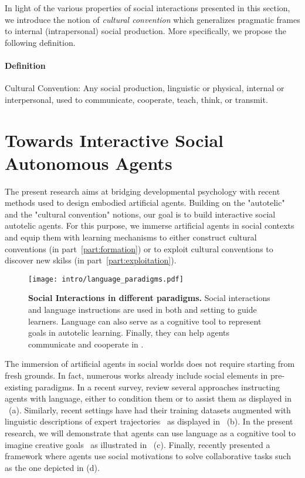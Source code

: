 In light of the various properties of social interactions presented in this section, we introduce the notion of \textit{cultural convention} which generalizes pragmatic frames to internal (intrapersonal) social production. More specifically, we propose the following definition.

\begin{tcolorbox}
\small
\paragraph{Definition}
\gls{Cultural Convention}: Any social production, linguistic or physical, internal or interpersonal, used to communicate, cooperate, teach, think, or transmit.
\end{tcolorbox}

\newpage

\section{Towards Interactive Social Autonomous Agents}

The present research aims at bridging developmental psychology with recent \ai methods used to design embodied artificial agents. Building on the "autotelic" and the "cultural convention" notions, our goal is to build interactive social autotelic agents. For this purpose, we immerse artificial agents in social contexts and equip them with learning mechanisms to either construct cultural conventions (in part~\ref{part:formation}) or to exploit cultural conventions to discover new skilss (in part~\ref{part:exploitation}). 

\begin{figure}[!h]
\centering
\texttt{[image: intro/language\_paradigms.pdf]}
\caption{\textbf{Social Interactions in different \ai paradigms.} Social interactions and language instructions are used in both \rl and \il setting to guide learners. Language can also serve as a cognitive tool to represent goals in autotelic learning. Finally, they can help agents communicate and cooperate in \marl.}
\label{fig:intro_language_paradigms}
\end{figure}

The immersion of artificial agents in social worlds does not require starting from fresh grounds. In fact, numerous works already include social elements in pre-existing \ai paradigms. In a recent survey, \citet{Luketina2019} review several approaches instructing \rl agents with language, either to condition them or to assist them as displayed in ~(a). Similarly, recent \il settings have had their training datasets augmented with linguistic descriptions of expert trajectories~\citep{ALFRED20,pashevich2021episodic} as displayed in ~(b). In the present research, we will demonstrate that agents can use language as a cognitive tool to imagine creative goals~\citep{colas2022language} as illustrated in ~(c). Finally, \citet{jaques2019social} recently presented a \marl framework where agents use social motivations to solve collaborative tasks such as the one depicted in (d). 

